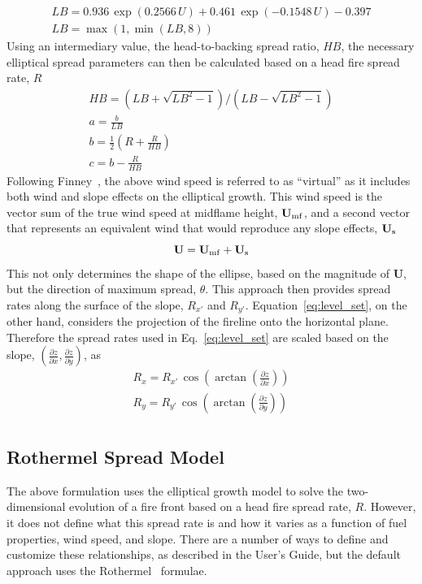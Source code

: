 \begin{gather}
L B=0.936 \, \exp (0.2566 \, U)+0.461 \, \exp (-0.1548 \, U)-0.397 \\[8pt]
L B=\max (1, \min (L B, 8))
\end{gather}
Using an intermediary value, the head-to-backing spread ratio, $H B$, the necessary elliptical spread parameters can then be calculated based on a head fire spread rate, $R$
\begin{gather}
H B = \left(L B+\sqrt{L B^{2}-1}\right) /\left(L B-\sqrt{L B^{2}-1}\right) \\[8pt]
a = \frac{b}{L B} \\[8pt]
b = \frac{1}{2}\left(R+\frac{R}{H B}\right) \\[8pt]
c = b-\frac{R}{H B}
\end{gather}
Following Finney~\cite{Finney:FARSITE}, the above wind speed is referred to as ``virtual'' as it includes both wind and slope effects on the elliptical growth. This wind speed is the vector sum of the true wind speed at midflame height, $\mathbf{U}_{\rm mf}$, and a second vector that represents an equivalent wind that would reproduce any slope effects, $\mathbf{U}_{\rm s}$ 
\begin{equation}
\mathbf{U} = \mathbf{U}_{\rm mf} + \mathbf{U}_{\rm s}
\end{equation}
This not only determines the shape of the ellipse, based on the magnitude of $\mathbf{U}$, but the direction of maximum spread, $\theta$. This approach then provides spread rates along the surface of the slope, $R_{x'}$ and $R_{y'}$. Equation~\ref{eq:level_set}, on the other hand, considers the projection of the fireline onto the horizontal plane. Therefore the spread rates used in Eq.~\ref{eq:level_set} are scaled based on the slope, $\left(\frac{\partial z}{\partial x},\frac{\partial z}{\partial y}\right)$, as
\begin{gather}
R_x = R_{x'} \, \cos \left(\arctan \left(\frac{\partial z}{\partial x}\right)\right) \\[8pt]
R_y = R_{y'} \, \cos \left(\arctan \left(\frac{\partial z}{\partial y}\right)\right) \\[8pt]
\end{gather}

\subsection{Rothermel Spread Model}

The above formulation uses the elliptical growth model to solve the two-dimensional evolution of a fire front based on a head fire spread rate, $R$. However, it does not define what this spread rate is and how it varies as a function of fuel properties, wind speed, and slope. There are a number of ways to define and customize these relationships, as described in the User's Guide, but the default approach uses the Rothermel~\cite{Rothermel:1972,Albini:1976} formulae. 

